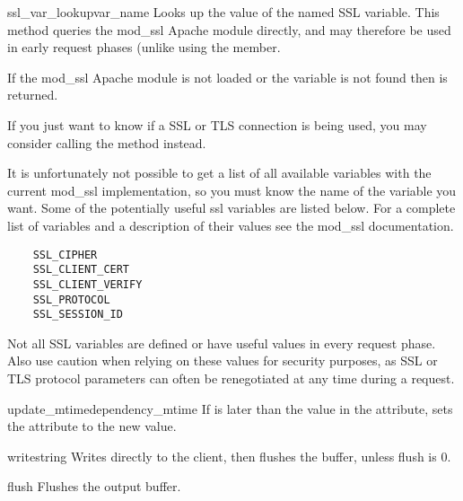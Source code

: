 \begin{methoddesc}[request]{ssl_var_lookup}{var_name}
  Looks up the value of the named SSL variable.  This method queries
  the mod_ssl Apache module directly, and may therefore be used in
  early request phases (unlike using the  member.

  If the mod_ssl Apache module is not loaded or the variable is not
  found then  is returned.

  If you just want to know if a SSL or TLS connection is being used,
  you may consider calling the  method instead.

  It is unfortunately not possible to get a list of all available
  variables with the current mod_ssl implementation, so you must know
  the name of the variable you want.  Some of the potentially useful
  ssl variables are listed below.  For a complete list of variables
  and a description of their values see the mod_ssl documentation.

  \begin{verbatim}
    SSL_CIPHER
    SSL_CLIENT_CERT
    SSL_CLIENT_VERIFY
    SSL_PROTOCOL
    SSL_SESSION_ID
  \end{verbatim}

  \begin{notice}
  Not all SSL variables are defined or have useful values in every
  request phase.  Also use caution when relying on these values for
  security purposes, as SSL or TLS protocol parameters can often be
  renegotiated at any time during a request.
  \end{notice}

\end{methoddesc}

\begin{methoddesc}[request]{update_mtime}{dependency_mtime}
  If  is later than the value in the 
  attribute, sets the attribute to the new value.
\end{methoddesc}

\begin{methoddesc}[request]{write}{string}
  Writes  directly to the client, then flushes the buffer,
  unless flush is 0.
\end{methoddesc}

\begin{methoddesc}[request]{flush}{}
  Flushes the output buffer.
\end{methoddesc}


